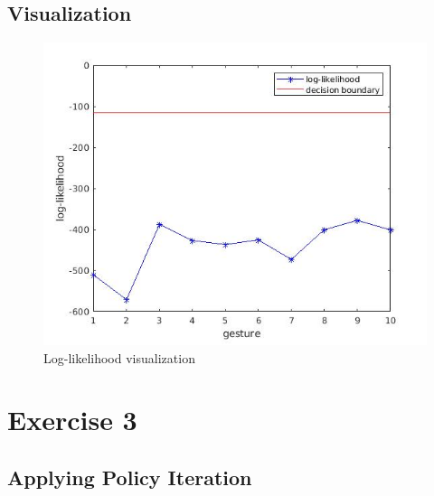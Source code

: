 \documentclass{article}
\begin{document}
\subsection{Visualization}
\begin{figure}[ht]
	\centering
	\includegraphics[width=1\linewidth]{EX2.jpg} 
	\caption{Log-likelihood visualization}  
\end{figure}

\newpage
\section{Exercise 3}
\subsection{Applying Policy Iteration}
\end{document}
